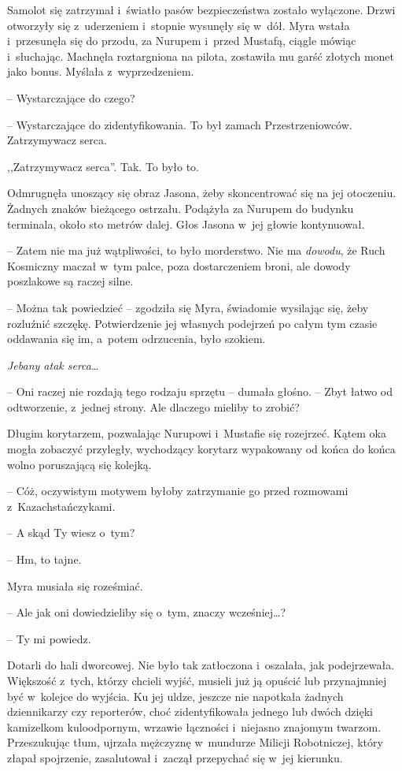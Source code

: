 \documentclass[oneside,polish,11pt,sfheadings]{mwbk}
\begin{document}
Samolot się zatrzymał i~światło pasów bezpieczeństwa zostało wyłączone.
Drzwi otworzyły się z~uderzeniem i~stopnie wysunęły się w~dół. Myra
wstała i~przesunęła się do przodu, za Nurupem i~przed Mustafą, ciągle
mówiąc i~słuchając. Machnęła roztargniona na pilota, zostawiła mu garść
złotych monet jako bonus. Myślała z~wyprzedzeniem.

-- Wystarczające do czego?

-- Wystarczające do zidentyfikowania. To był zamach Przestrzeniowców.
Zatrzymywacz serca.

,,Zatrzymywacz serca''. Tak. To było to.

Odmrugnęła unoszący się obraz Jasona, żeby skoncentrować się na jej
otoczeniu. Żadnych znaków bieżącego ostrzału. Podążyła za Nurupem do
budynku terminala, około sto metrów dalej. Głos Jasona w~jej głowie
kontynuował.

-- Zatem nie ma już wątpliwości, to było morderstwo. Nie ma
\textit{dowodu}, że Ruch Kosmiczny maczał w~tym palce, poza dostarczeniem
broni, ale dowody poszlakowe są raczej silne.

-- Można tak powiedzieć -- zgodziła się Myra, świadomie wysilając się,
żeby rozluźnić szczękę. Potwierdzenie jej własnych podejrzeń po całym
tym czasie oddawania się im, a~potem odrzucenia, było szokiem.

\textit{Jebany atak serca}\ldots

-- Oni raczej nie rozdają tego rodzaju sprzętu -- dumała głośno. -- Zbyt
łatwo od odtworzenie, z~jednej strony. Ale dlaczego mieliby to zrobić?

Długim korytarzem, pozwalając Nurupowi i~Mustafie się rozejrzeć. Kątem
oka mogła zobaczyć przyległy, wychodzący korytarz wypakowany od końca do
końca wolno poruszającą się kolejką.

-- Cóż, oczywistym motywem byłoby zatrzymanie go przed rozmowami z~Kazachstańczykami.

-- A skąd Ty wiesz o~tym?

-- Hm, to tajne.

Myra musiała się roześmiać.

-- Ale jak oni dowiedzieliby się o~tym, znaczy wcześniej\ldots?

-- Ty mi powiedz.

Dotarli do hali dworcowej. Nie było tak zatłoczona i~oszalała, jak
podejrzewała. Większość z~tych, którzy chcieli wyjść, musieli już ją
opuścić lub przynajmniej być w~kolejce do wyjścia. Ku jej uldze, jeszcze
nie napotkała żadnych dziennikarzy czy reporterów, choć zidentyfikowała
jednego lub dwóch dzięki kamizelkom kuloodpornym, wrzawie łączności i~niejasno znajomym twarzom. Przeszukując tłum, ujrzała mężczyznę w~mundurze Milicji Robotniczej, który złapał spojrzenie, zasalutował i~zaczął przepychać się w~jej kierunku.
\end{document}
